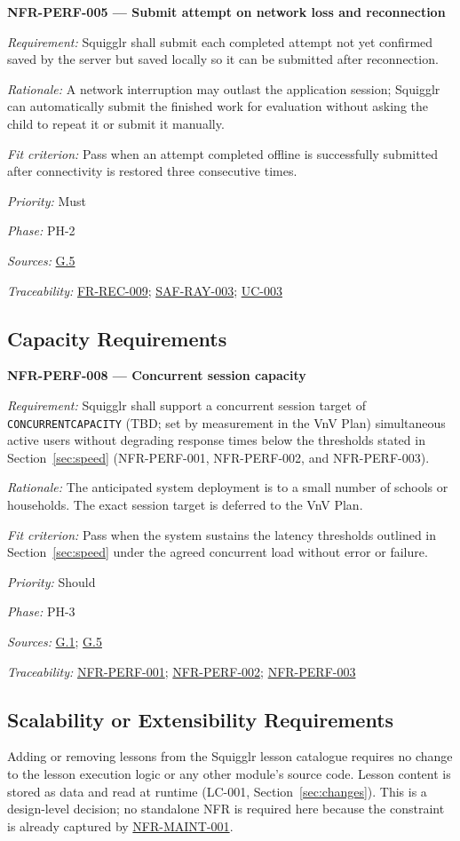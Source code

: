 \documentclass[12pt]{article}
\renewcommand{\_}{\textunderscore\allowbreak}%
\newcommand{\goalref}[1]{\hyperref[goal:#1]{G.#1}}
\newcommand{\ucref}[1]{\hyperref[uc:#1]{\mbox{UC-#1}}}
\newenvironment{srsrequirement}[2]{%
  \par\medskip\noindent\phantomsection\label{req:#1}%
  \textbf{#1 --- #2}\par\nobreak\smallskip }{\par\medskip}
\newcommand{\reqfield}[2]{\noindent\textit{#1:} #2\par}
\newcommand{\reqshall}[1]{\reqfield{Requirement}{#1}}
\newcommand{\reqrationale}[1]{\reqfield{Rationale}{#1}}
\newcommand{\reqfit}[1]{\reqfield{Fit criterion}{#1}}
\newcommand{\reqpriority}[1]{\reqfield{Priority}{#1}}
\newcommand{\reqphase}[1]{\reqfield{Phase}{#1}}
\newcommand{\reqsources}[1]{\reqfield{Sources}{#1}}
\newcommand{\reqtraces}[1]{\reqfield{Traceability}{#1}}
\newcommand{\reqref}[1]{\hyperref[req:#1]{#1}}
\providecommand{\ucref}[1]{\hyperref[uc:#1]{UC-#1}}
\begin{document}
\begin{srsrequirement}{NFR-PERF-005}{Submit attempt on network loss and reconnection}
  \reqshall{Squigglr shall submit each completed attempt not yet confirmed saved
by the server but saved locally so it can be submitted after reconnection.}
\reqrationale{A network interruption may outlast the application session;
Squigglr can automatically submit the finished work for evaluation without
asking the child to repeat it or submit it manually.} \reqfit{Pass when an
attempt completed offline is successfully submitted after connectivity is
restored three consecutive times.}
  \reqpriority{Must}
  \reqphase{PH-2}
  \reqsources{\goalref{5}} \reqtraces{\reqref{FR-REC-009}; \reqref{SAF-RAY-003};
  \ucref{003}}
\end{srsrequirement}

\subsection{Capacity Requirements}

\begin{srsrequirement}{NFR-PERF-008}{Concurrent session capacity}
  \reqshall{Squigglr shall support a concurrent session target of
\texttt{CONCURRENT\_CAPACITY} (TBD; set by measurement in the VnV Plan) simultaneous active users without degrading
response times below the thresholds stated in Section~\ref{sec:speed}
(NFR-PERF-001, NFR-PERF-002, and NFR-PERF-003).} \reqrationale{The anticipated
system deployment is to a small number of schools or households. The exact
session target is deferred to the VnV Plan.} \reqfit{Pass when the system
sustains the latency thresholds outlined in Section~\ref{sec:speed} under the
agreed concurrent load without error or failure.}
  \reqpriority{Should}
  \reqphase{PH-3}
  \reqsources{\goalref{1}; \goalref{5}} \reqtraces{\reqref{NFR-PERF-001};
  \reqref{NFR-PERF-002}; \reqref{NFR-PERF-003}}
\end{srsrequirement}

\subsection{Scalability or Extensibility Requirements}

Adding or removing lessons from the Squigglr lesson catalogue requires no change
to the lesson execution logic or any other module's source code. Lesson content
is stored as data and read at runtime (LC-001, Section~\ref{sec:changes}). This
is a design-level decision; no standalone NFR is required here because the
constraint is already captured by \reqref{NFR-MAINT-001}.
\end{document}
